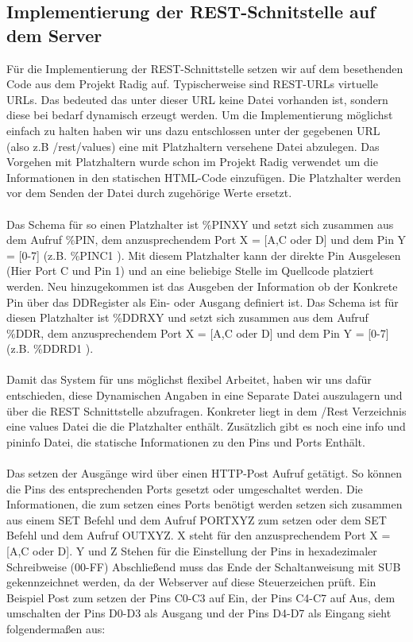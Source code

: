 \subsection{Implementierung der REST-Schnitstelle auf dem Server}
Für die Implementierung der REST-Schnittstelle setzen wir auf dem besethenden
Code aus dem Projekt Radig auf. Typischerweise sind REST-URLs virtuelle URLs.
Das bedeuted das unter dieser URL keine Datei vorhanden ist, sondern diese bei
bedarf dynamisch erzeugt werden. Um die Implementierung möglichst einfach zu
halten haben wir uns dazu entschlossen unter der gegebenen URL (also z.B  
\textrm{/rest/values}) eine mit Platzhaltern versehene Datei abzulegen. Das
Vorgehen mit Platzhaltern wurde schon im Projekt Radig verwendet um die
Informationen in den statischen HTML-Code einzufügen. Die Platzhalter
werden vor dem Senden der Datei durch zugehörige Werte ersetzt.\\
\\
Das Schema für so einen Platzhalter ist \textrm{\%PINXY} und setzt sich zusammen aus dem
Aufruf \textrm{\%PIN}, dem anzusprechendem Port X = [A,C oder D] und dem Pin Y = [0-7] (z.B.
\textrm{\%PINC1 } ). Mit diesem Platzhalter kann der direkte Pin Ausgelesen
(Hier Port C und Pin 1) und an eine beliebige Stelle im Quellcode platziert werden. Neu
hinzugekommen ist das Ausgeben der Information ob der Konkrete Pin über das
DDRegister als Ein- oder Ausgang definiert ist. Das Schema ist für diesen
Platzhalter ist \textrm{\%DDRXY} und setzt sich zusammen aus dem Aufruf \textrm{\%DDR}, dem
anzusprechendem Port X = [A,C oder D] und dem Pin Y = [0-7] (z.B.
\textrm{\%DDRD1} ). \\
\\
Damit das System für uns möglichst flexibel Arbeitet, haben wir uns dafür
entschieden, diese Dynamischen Angaben in eine Separate Datei auszulagern und
über die REST Schnittstelle abzufragen. Konkreter liegt in dem /Rest
Verzeichnis eine \textrm{values} Datei die die Platzhalter enthält. Zusätzlich
gibt es noch eine \textrm{info} und \textrm{pininfo} Datei, die statische
Informationen zu den Pins und Ports Enthält. \\
\\
Das setzen der Ausgänge wird über einen HTTP-Post Aufruf getätigt. So können die
Pins des entsprechenden Ports gesetzt oder umgeschaltet werden. Die
Informationen, die zum setzen eines Ports benötigt werden setzen sich zusammen
aus einem \textrm{SET} Befehl und dem Aufruf PORTXYZ zum setzen oder dem
\textrm{SET} Befehl und dem Aufruf OUTXYZ. X steht für den anzusprechendem Port
X = [A,C oder D]. Y und Z Stehen für die Einstellung der Pins in hexadezimaler
Schreibweise (00-FF) Abschließend muss das Ende der Schaltanweisung mit
\textrm{SUB} gekennzeichnet werden, da der Webserver auf diese Steuerzeichen
prüft. Ein Beispiel Post zum setzen der Pins C0-C3 auf Ein, der Pins C4-C7 auf
Aus, dem umschalten der Pins D0-D3 als Ausgang und der Pins D4-D7 als Eingang
sieht folgendermaßen aus:
\\

